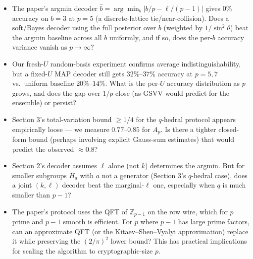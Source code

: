 \documentclass[11pt]{article}
\begin{document}
\begin{itemize}
\item[\textbf{Q1}] The paper's argmin decoder $\hat b=\arg\min_b|b/p-\ell/(p-1)|$
gives 0\% accuracy on $b=3$ at $p=5$ (a discrete-lattice tie/near-collision).
Does a soft/Bayes decoder using the full posterior over $b$ (weighted by
$1/\sin^{2}\theta$) beat the argmin baseline across all $b$ uniformly, and if
so, does the per-$b$ accuracy variance vanish as $p\to\infty$?

\item[\textbf{Q2}] Our fresh-$U$ random-basis experiment confirms average
indistinguishability, but a fixed-$U$ MAP decoder still gets $32\%$--$37\%$
accuracy at $p=5,7$ vs.\ uniform baseline $20\%$--$14\%$. What is the
per-$U$ accuracy distribution as $p$ grows, and does the gap over $1/p$
close (as GSVV would predict for the ensemble) or persist?

\item[\textbf{Q3}] Section 3's total-variation bound $\ge 1/4$ for the
$q$-hedral protocol appears empirically loose --- we measure $0.77$--$0.85$
for $A_p$. Is there a tighter closed-form bound (perhaps involving explicit
Gauss-sum estimates) that would predict the observed $\approx 0.8$?

\item[\textbf{Q4}] Section 2's decoder assumes $\ell$ alone (not $k$)
determines the argmin. But for smaller subgroups $H_a$ with $a$ not a
generator (Section 3's $q$-hedral case), does a joint $(k,\ell)$ decoder
beat the marginal-$\ell$ one, especially when $q$ is much smaller than $p-1$?

\item[\textbf{Q5}] The paper's protocol uses the QFT of $\mathbb{Z}_{p-1}$
on the row wire, which for $p$ prime and $p-1$ smooth is efficient. For
$p$ where $p-1$ has large prime factors, can an approximate QFT (or the
Kitaev--Shen--Vyalyi approximation) replace it while preserving the
$(2/\pi)^{2}$ lower bound? This has practical implications for scaling the
algorithm to cryptographic-size $p$.
\end{itemize}
\end{document}

